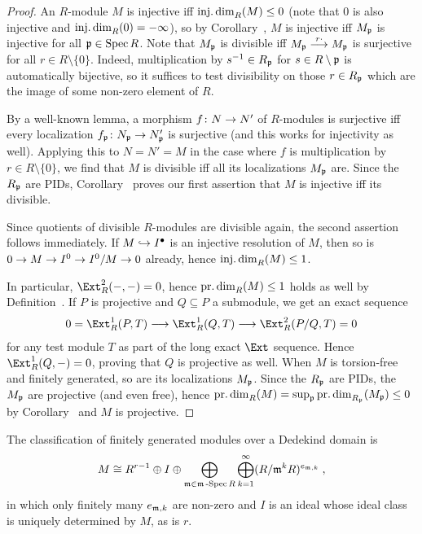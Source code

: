\documentclass[a4paper,parskip=half,numbers=enddot, DIV=12]{scrreprt}
\begin{document}
\begin{proof}
	An $R$-module $M$ is injective iff $\operatorname{inj.dim}_R(M)\leq 0$ (note that $0$ is also injective and $\operatorname{inj.dim}_R(0)=-\infty$), so by Corollary~, $M$ is injective iff $M_{\mathfrak{p}}$ is injective for all $\mathfrak{p}\in \operatorname{Spec} R$. Note that $M_{\mathfrak{p}}$ is divisible iff $M_\pp\morphism[r\cdot]M_\pp$ is surjective for all $r\in R\setminus\{0\}$. Indeed, multiplication by $s^{-1}\in R_{\mathfrak{p}}$ for $s\in R\setminus \mathfrak{p}$ is automatically bijective, so it suffices to test divisibility on those $r\in R_{\mathfrak{p}}$ which are the image of some non-zero element of $R$.
	
	By a well-known lemma, a morphism $f\colon N\morphism N'$ of $R$-modules is surjective iff every localization $f_\pp\colon N_\pp\morphism N'_\pp$ is surjective (and this works for injectivity as well). Applying this to $N=N'=M$ in the case where $f$ is multiplication by $r\in R\setminus\{0\}$, we find that $M$ is divisible iff all its localizations $M_{\mathfrak{p}}$ are. Since the $R_{\mathfrak{p}}$ are PIDs, Corollary~ proves our first assertion that $M$ is injective iff its divisible.
	
	Since quotients of divisible $R$-modules are divisible again, the second assertion follows immediately. If $M\monomorphism I^\bullet$ is an injective resolution of $M$, then so is $0\morphism M\morphism I^0\morphism I^0/M\morphism 0$ already, hence $\operatorname{inj.dim}_R(M)\leq 1$.
	
	In particular, $\Ext_R^2(-,-)=0$, hence $\operatorname{pr.dim}_R(M)\leq 1$ holds as well by Definition~. If $P$ is projective and $Q\subseteq P$ a submodule, we get an exact sequence 
	\begin{align*}
		0=\Ext_R^1(P,T)\morphism\Ext_R^1(Q,T)\morphism\Ext_R^2(P/Q,T)=0
	\end{align*}
	for any test module $T$ as part of the long exact $\Ext$ sequence. Hence $\Ext_R^1(Q,-)=0$, proving that $Q$ is projective as well. When $M$ is torsion-free and finitely generated, so are its localizations $M_{\mathfrak{p}}$. Since the $R_{\mathfrak{p}}$ are PIDs, the $M_{\mathfrak{p}}$ are projective (and even free), hence $\operatorname{pr.dim}_R(M)=\sup_{\mathfrak{p}}\operatorname{pr.dim}_{R_{\mathfrak{p}}}(M_{\mathfrak{p}})\leq 0$ by Corollary~ and $M$ is projective.
\end{proof}
\begin{rem*}
	The classification of finitely generated modules over a Dedekind domain is
	\begin{align*}
		M\cong R^{r-1}\oplus I\oplus \bigoplus_{\mathfrak{m}\in\mathfrak{m}\operatorname{-Spec} R}\bigoplus_{k=1}^\infty (R/\mathfrak{m}^kR)^{e_{\mathfrak{m},k}}\;,
	\end{align*}
	in which only finitely many $e_{\mathfrak{m},k}$ are non-zero and $I$ is an ideal whose ideal class is uniquely determined by $M$, as is $r$.
\end{rem*}
	
\end{document}
